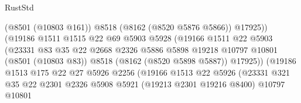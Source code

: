 \begin{lexlean}{RustStd}
\begin{coremodule}
                                          (@8501 (@10803 @161))
                                          @8518
                                          (@8162 (@8520 @5876 @5866))
                                          @17925))
                                      (@19186
                                        @1511
                                        @1515
                                        @22
                                        @69
                                        @5903
                                        @5928
                                        (@19166
                                          @1511
                                          @22
                                          @5903
                                          (@23331
                                            @83
                                            @35
                                            @22
                                            @2668
                                            @2326
                                            @5886
                                            @5898
                                            @19218
                                            @10797
                                            @10801
                                            (@8501 (@10803 @83))
                                            @8518
                                            (@8162 (@8520 @5898 @5887))
                                            @17925))
                                        (@19186
                                          @1513
                                          @175
                                          @22
                                          @27
                                          @5926
                                          @2256
                                          (@19166
                                            @1513
                                            @22
                                            @5926
                                            (@23331
                                              @321
                                              @35
                                              @22
                                              @2301
                                              @2326
                                              @5908
                                              @5921
                                              (@19213 @2301 @19216 @8400)
                                              @10797
                                              @10801

\end{coremodule}
\end{lexlean}

